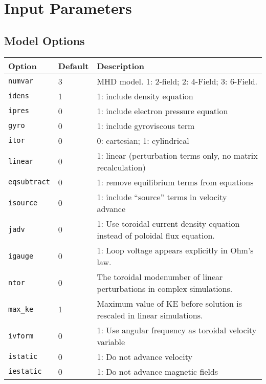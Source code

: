 \documentclass[letterpaper]{book}
\begin{document}
\section{Input Parameters}
\label{sec:input_parameters}

\subsection{Model Options}

\begin{tabular}{llp{3in}}
  \textbf{Option}&\textbf{Default}&\textbf{Description}\\
  \hline
  \texttt{numvar} & 3   & MHD model. 1: 2-field;  2: 4-Field;  3: 6-Field.\\
  \texttt{idens}  & 1   & 1: include density equation\\
  \texttt{ipres}  & 0   & 1: include electron pressure equation\\
  \texttt{gyro}   & 0   & 1: include gyroviscous term\\
  \texttt{itor}   & 0   & 0: cartesian; 1: cylindrical\\
  \texttt{linear} & 0   & 1: linear (perturbation terms only, no matrix
                              recalculation)\\
  \texttt{eqsubtract}& 0& 1: remove equilibrium terms from equations\\
  \texttt{isource}   & 0& 1: include ``source'' terms in velocity
    advance\\
  \texttt{jadv}   & 0   & 1: Use toroidal current density equation
                          instead of poloidal flux equation.\\
  \texttt{igauge} & 0   & 1: Loop voltage appears explicitly in Ohm's law.\\
  \texttt{ntor}   & 0   & The toroidal modenumber of linear perturbations in
                          complex simulations.\\
  \texttt{max\_ke}& 1   & Maximum value of KE before solution is
                          rescaled in linear simulations.\\
  \texttt{ivform} & 0   & 1: Use angular frequency as toroidal velocity
                             variable\\
  \texttt{istatic}& 0   & 1: Do not advance velocity\\
  \texttt{iestatic}&0   & 1: Do not advance magnetic fields\\
\end{tabular}
\end{document}
